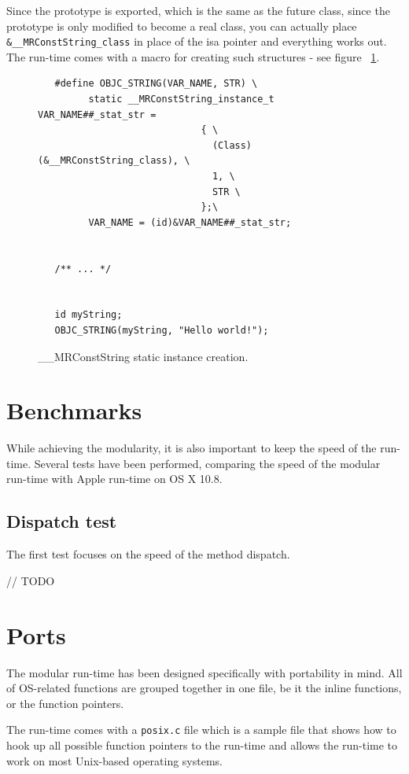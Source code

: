 Since the prototype is exported, which is the same as the future class, since the prototype is only modified to become a real class, you can actually place \verb=&__MRConstString_class= in place of the isa pointer and everything works out. The run-time comes with a macro for creating such structures - see figure ~\ref{fig:mr_const_str_creation}.

\begin{figure}
  \begin{verbatim}
   #define OBJC_STRING(VAR_NAME, STR) \
         static __MRConstString_instance_t VAR_NAME##_stat_str = 
                             { \
                               (Class)(&__MRConstString_class), \
                               1, \
                               STR \
                             };\
         VAR_NAME = (id)&VAR_NAME##_stat_str;


   /** ... */
   
 
   id myString;
   OBJC_STRING(myString, "Hello world!");
   \end{verbatim}
  \centering{}
  \caption{\_\_MRConstString static instance creation.}
  \label{fig:mr_const_str_creation}
\end{figure}

\section{Benchmarks}

While achieving the modularity, it is also important to keep the speed of the run-time. Several tests have been performed, comparing the speed of the modular run-time with Apple run-time on OS X 10.8.

\subsection{Dispatch test}

The first test focuses on the speed of the method dispatch.


// TODO

\section{Ports}

The modular run-time has been designed specifically with portability in mind. All of OS-related functions are grouped together in one file, be it the inline functions, or the function pointers.

The run-time comes with a \verb=posix.c= file which is a sample file that shows how to hook up all possible function pointers to the run-time and allows the run-time to work on most Unix-based operating systems.

